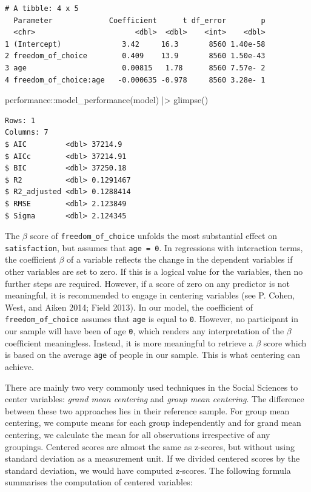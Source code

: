 \documentclass[
  letterpaper,
]{krantz}
\makeatletter
\newenvironment{Shaded}{\begin{snugshade}}{\end{snugshade}}
\newcommand{\FunctionTok}[1]{\textcolor[rgb]{0.28,0.35,0.67}{#1}}
\newcommand{\NormalTok}[1]{\textcolor[rgb]{0.00,0.23,0.31}{#1}}
\newcommand{\SpecialCharTok}[1]{\textcolor[rgb]{0.37,0.37,0.37}{#1}}
\newenvironment{kframe}{%
\medskip{}
\setlength{\fboxsep}{.8em}
 \def\at@end@of@kframe{}%
 \ifinner\ifhmode%
  \def\at@end@of@kframe{\end{minipage}}%
  \begin{minipage}{\columnwidth}%
 \fi\fi%
 \def\FrameCommand##1{\hskip\@totalleftmargin \hskip-\fboxsep
 \colorbox{shadecolor}{##1}\hskip-\fboxsep
     \hskip-\linewidth \hskip-\@totalleftmargin \hskip\columnwidth}%
 \MakeFramed {\advance\hsize-\width
   \@totalleftmargin\z@ \linewidth\hsize
   \@setminipage}}%
 {\par\unskip\endMakeFramed%
 \at@end@of@kframe}
\renewenvironment{Shaded}{\begin{kframe}}{\end{kframe}}
\makeatother
\begin{document}
\begin{verbatim}
# A tibble: 4 x 5
  Parameter             Coefficient      t df_error        p
  <chr>                       <dbl>  <dbl>    <int>    <dbl>
1 (Intercept)              3.42     16.3       8560 1.40e-58
2 freedom_of_choice        0.409    13.9       8560 1.50e-43
3 age                      0.00815   1.78      8560 7.57e- 2
4 freedom_of_choice:age   -0.000635 -0.978     8560 3.28e- 1
\end{verbatim}

\begin{Shaded}
\begin{Highlighting}[]
\NormalTok{performance}\SpecialCharTok{::}\FunctionTok{model\_performance}\NormalTok{(model) }\SpecialCharTok{|\textgreater{}}
  \FunctionTok{glimpse}\NormalTok{()}
\end{Highlighting}
\end{Shaded}

\begin{verbatim}
Rows: 1
Columns: 7
$ AIC         <dbl> 37214.9
$ AICc        <dbl> 37214.91
$ BIC         <dbl> 37250.18
$ R2          <dbl> 0.1291467
$ R2_adjusted <dbl> 0.1288414
$ RMSE        <dbl> 2.123849
$ Sigma       <dbl> 2.124345
\end{verbatim}

The \(\beta\) score of \texttt{freedom\_of\_choice} unfolds the most
substantial effect on \texttt{satisfaction}, but assumes that
\texttt{age\ =\ 0}. In regressions with interaction terms, the
coefficient \(\beta\) of a variable reflects the change in the dependent
variables if other variables are set to zero. If this is a logical value
for the variables, then no further steps are required. However, if a
score of zero on any predictor is not meaningful, it is recommended to
engage in centering variables (see P. Cohen, West, and Aiken 2014; Field
2013). In our model, the coefficient of \texttt{freedom\_of\_choice}
assumes that \texttt{age} is equal to \texttt{0}. However, no
participant in our sample will have been of age \texttt{0}, which
renders any interpretation of the \(\beta\) coefficient meaningless.
Instead, it is more meaningful to retrieve a \(\beta\) score which is
based on the average \texttt{age} of people in our sample. This is what
centering can achieve.

There are mainly two very commonly used techniques in the Social
Sciences to center variables: \emph{grand mean centering} and
\emph{group mean centering}. The difference between these two approaches
lies in their reference sample. For group mean centering, we compute
means for each group independently and for grand mean centering, we
calculate the mean for all observations irrespective of any groupings.
Centered scores are almost the same as z-scores, but without using
standard deviation as a measurement unit. If we divided centered scores
by the standard deviation, we would have computed z-scores. The
following formula summarises the computation of centered variables:
\end{document}
